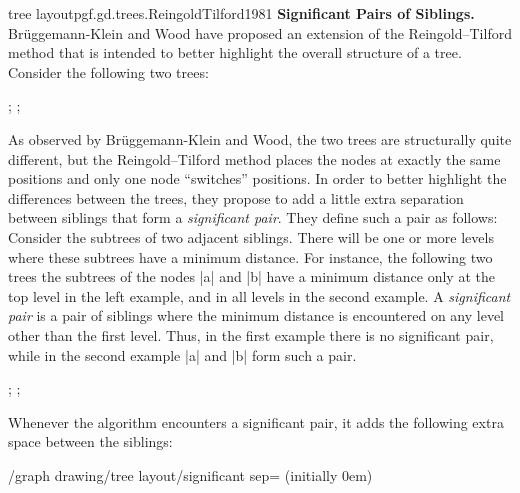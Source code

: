 \begin{gdalgorithm}{tree layout}{pgf.gd.trees.ReingoldTilford1981}
  \noindent\textbf{Significant Pairs of Siblings.}
  Br\"uggemann-Klein and Wood have proposed an extension of the
  Reingold--Tilford method that is intended to better highlight the
  overall structure of a tree. Consider the following two trees:

\begin{codeexample}[]
\tikz [baseline=(a.base), tree layout, minimum number of children=2,
       sibling distance=5mm, level distance=5mm]
;\quad
\tikz [baseline=(a.base), tree layout, minimum number of children=2,
       sibling distance=5mm, level distance=5mm]
;
\end{codeexample}  
  As observed by Br\"uggemann-Klein and Wood, the two trees are
  structurally quite different, but the Reingold--Tilford method
  places the nodes at exactly the same positions and only one node
  ``switches'' positions. In order to better highlight the differences
  between the trees, they propose to add a little extra separation
  between siblings that form a \emph{significant pair}. They define
  such a pair as follows: Consider the subtrees of two adjacent
  siblings. There will be one or more levels where these subtrees have
  a minimum distance. For instance, the following two trees the
  subtrees of the nodes |a| and |b| have a minimum distance only at
  the top level in the left example, and in all levels in the second
  example. A \emph{significant pair} is a pair of siblings where the
  minimum distance is encountered on any level other than the first
  level. Thus, in the first example there is no significant pair,
  while in the second example |a| and |b| form such a pair.
\begin{codeexample}[]
\tikz {};
\quad
\tikz {};
\end{codeexample}
  Whenever the algorithm encounters a significant pair, it adds the
  following extra space between the siblings:
  \begin{key}{/graph drawing/tree layout/significant
      sep= (initially 0em)}

\end{key}
\end{gdalgorithm}

